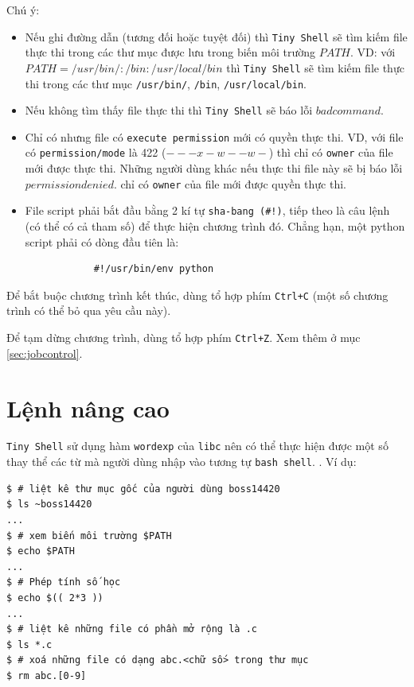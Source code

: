 \documentclass[a4paper,12pt]{report}
\begin{document}
    Chú ý:
    \begin{itemize}
        \item Nếu ghi đường dẫn (tương đối hoặc tuyệt đối) thì \texttt{Tiny
            Shell} sẽ tìm kiếm file thực thi trong các thư mục được lưu
            trong biến môi trường $PATH$. VD: với $PATH =
            /usr/bin/:/bin:/usr/local/bin$ thì \texttt{Tiny Shell} sẽ tìm
            kiếm file thực thi trong các thư mục \texttt{/usr/bin/},
            \texttt{/bin}, \texttt{/usr/local/bin}.
        \item Nếu không tìm thấy file thực thi thì \texttt{Tiny Shell} sẽ
            báo lỗi $bad command$.
        \item Chỉ có nhưng file có \texttt{execute permission} mới có quyền
            thực thi. VD, với file có \texttt{permission/mode} là 422
            ($---x-w--w-$) thì chỉ có \texttt{owner} của file mới được thực
            thi. Những người dùng khác nếu thực thi file này sẽ bị báo lỗi
            $permission denied$.
            chỉ có \texttt{owner} của file mới được quyền thực thi.
        \item File script phải bắt đầu bằng 2 kí tự \texttt{sha-bang (\#!)},
            tiếp theo là câu lệnh (có thể có cả tham số) để thực hiện
            chương trình đó. Chẳng hạn, một python script phải có dòng đầu
            tiên là:\\
            \begin{verbatim}
            #!/usr/bin/env python
            \end{verbatim}
    \end{itemize}

    Để bắt buộc chương trình kết thúc, dùng tổ hợp phím \texttt{Ctrl+C}
    (một số chương trình có thể bỏ qua yêu cầu này).

    Để tạm dừng chương trình, dùng tổ hợp phím \texttt{Ctrl+Z}. Xem thêm ở mục 
    \textcolor{blue}{\ref{sec:jobcontrol}}.

    \section{Lệnh nâng cao}
    \texttt{Tiny Shell} sử dụng hàm \texttt{wordexp} của \texttt{libc}
    nên có thể thực hiện được một số thay thể các từ mà người dùng nhập vào
    tương tự \texttt{bash shell}. \citep{LCWE}. Ví dụ:
    \begin{verbatim}
$ # liệt kê thư mục gốc của người dùng boss14420
$ ls ~boss14420
...
$ # xem biến môi trường $PATH
$ echo $PATH
...
$ # Phép tính số học
$ echo $(( 2*3 ))
...
$ # liệt kê những file có phần mở rộng là .c
$ ls *.c
$ # xoá những file có dạng abc.<chữ số> trong thư mục
$ rm abc.[0-9]
    \end{verbatim}
        
\end{document}
